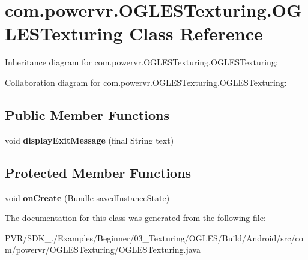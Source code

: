 \hypertarget{classcom_1_1powervr_1_1_o_g_l_e_s_texturing_1_1_o_g_l_e_s_texturing}{\section{com.\+powervr.\+O\+G\+L\+E\+S\+Texturing.\+O\+G\+L\+E\+S\+Texturing Class Reference}
\label{classcom_1_1powervr_1_1_o_g_l_e_s_texturing_1_1_o_g_l_e_s_texturing}
}


Inheritance diagram for com.\+powervr.\+O\+G\+L\+E\+S\+Texturing.\+O\+G\+L\+E\+S\+Texturing\+:


Collaboration diagram for com.\+powervr.\+O\+G\+L\+E\+S\+Texturing.\+O\+G\+L\+E\+S\+Texturing\+:
\subsection*{Public Member Functions}
\begin{DoxyCompactItemize}
\item 
\hypertarget{classcom_1_1powervr_1_1_o_g_l_e_s_texturing_1_1_o_g_l_e_s_texturing_afea968627a841ff91fcd6a1ce71c2846}{void {\bfseries display\+Exit\+Message} (final String text)}\label{classcom_1_1powervr_1_1_o_g_l_e_s_texturing_1_1_o_g_l_e_s_texturing_afea968627a841ff91fcd6a1ce71c2846}

\end{DoxyCompactItemize}
\subsection*{Protected Member Functions}
\begin{DoxyCompactItemize}
\item 
\hypertarget{classcom_1_1powervr_1_1_o_g_l_e_s_texturing_1_1_o_g_l_e_s_texturing_a41d7a79da4e107837be4face7e296a9a}{void {\bfseries on\+Create} (Bundle saved\+Instance\+State)}\label{classcom_1_1powervr_1_1_o_g_l_e_s_texturing_1_1_o_g_l_e_s_texturing_a41d7a79da4e107837be4face7e296a9a}

\end{DoxyCompactItemize}


The documentation for this class was generated from the following file\+:\begin{DoxyCompactItemize}
\item 
P\+V\+R/\+S\+D\+K\+\_./\+Examples/\+Beginner/03\+\_\+\+Texturing/\+O\+G\+L\+E\+S/\+Build/\+Android/src/com/powervr/\+O\+G\+L\+E\+S\+Texturing/O\+G\+L\+E\+S\+Texturing.\+java\end{DoxyCompactItemize}
